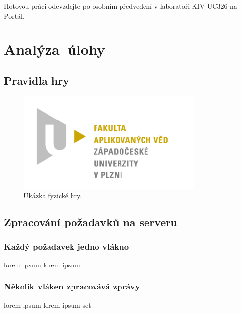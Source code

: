 \documentclass[12pt, a4paper]{article}
\begin{document}
Hotovou práci odevzdejte po osobním předvedení v laboratoři KIV UC326 na Portál.

\section{Analýza~úlohy} %

\subsection{Pravidla hry}

\begin{figure}[ht]
\centering
\includegraphics[bb= 0 0 600 637 , height=5cm]{favlogo.jpg}
\caption{Ukázka fyzické hry.}
\label{fig:game}
\end{figure}


\subsection{Zpracování požadavků na serveru}


\subsubsection{Každý požadavek jedno vlákno}

lorem ipsum lorem ipsum 

\subsubsection{Několik vláken zpracovává zprávy}

lorem ipsum lorem ipsum set 


\end{document}
